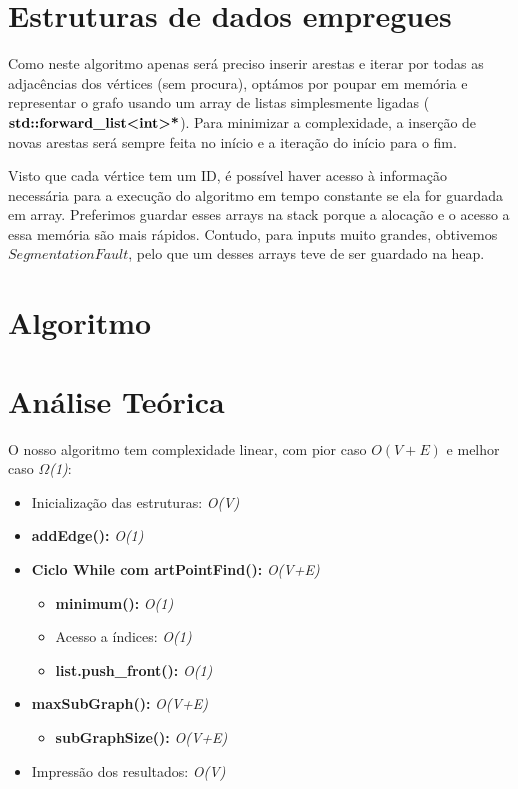 \documentclass[12pt]{article}
\begin{document}
\section{Estruturas de dados empregues}
    \par
    Como neste algoritmo apenas será preciso inserir arestas e iterar por todas as 
    adjacências dos vértices (sem procura), optámos por poupar em memória e representar o 
    grafo usando um array de listas simplesmente ligadas ($\textbf{std::forward\_list\textless int\textgreater*}$). 
    Para minimizar a complexidade, a inserção de novas arestas será sempre feita no início e a 
    iteração do início para o fim.
    \par
    Visto que cada vértice tem um ID, é possível haver acesso à informação necessária para a 
    execução do algoritmo em tempo constante se ela for guardada em array. Preferimos guardar 
    esses arrays na stack porque a alocação e o acesso a essa memória são mais rápidos. 
    Contudo, para inputs muito grandes, obtivemos $Segmentation Fault$, pelo que um desses 
    arrays teve de ser guardado na heap.
    
\section{Algoritmo}
\section{Análise Teórica} 
    O nosso algoritmo tem complexidade linear, com pior caso \textit{$O(V+E)$} 
    e melhor caso \textit{$\Omega$(1)}:
    \begin{itemize}
        \item Inicialização das estruturas: \textit{O(V)}
        \item \textbf{addEdge():} \textit{O(1)}
        \item \textbf{Ciclo While com artPointFind():} \textit{O(V+E)}
        \begin{itemize}
            \item \textbf{minimum():} \textit{O(1)}
            \item Acesso a índices: \textit{O(1)}
            \item \textbf{list.push\_front():} \textit{O(1)}
        \end{itemize}
        \item \textbf{maxSubGraph():} \textit{O(V+E)}
        \begin{itemize}
            \item \textbf{subGraphSize():} \textit{O(V+E)}
        \end{itemize}
        \item Impressão dos resultados: \textit{O(V)}
    \end{itemize}
\end{document}

